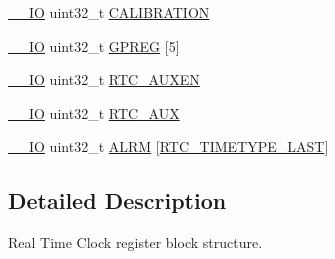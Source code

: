 \begin{DoxyCompactItemize}
\hyperlink{core__cm3_8h_aec43007d9998a0a0e01faede4133d6be}{\-\_\-\-\_\-\-I\-O} uint32\-\_\-t \hyperlink{structLPC__RTC__T_ade5b98ca9e6ea8af2fd91e8a4f20503b}{C\-A\-L\-I\-B\-R\-A\-T\-I\-O\-N}
\item 
\hyperlink{core__cm3_8h_aec43007d9998a0a0e01faede4133d6be}{\-\_\-\-\_\-\-I\-O} uint32\-\_\-t \hyperlink{structLPC__RTC__T_a6624a04c6db73e0f9e53a9bc3cf50c1a}{G\-P\-R\-E\-G} \mbox{[}5\mbox{]}
\item 
\hyperlink{core__cm3_8h_aec43007d9998a0a0e01faede4133d6be}{\-\_\-\-\_\-\-I\-O} uint32\-\_\-t \hyperlink{structLPC__RTC__T_af65651a26ceb3d710ccdba8f762a649f}{R\-T\-C\-\_\-\-A\-U\-X\-E\-N}
\item 
\hyperlink{core__cm3_8h_aec43007d9998a0a0e01faede4133d6be}{\-\_\-\-\_\-\-I\-O} uint32\-\_\-t \hyperlink{structLPC__RTC__T_ab476d508c9ea87e71724c30d36ece294}{R\-T\-C\-\_\-\-A\-U\-X}
\item 
\hyperlink{core__cm3_8h_aec43007d9998a0a0e01faede4133d6be}{\-\_\-\-\_\-\-I\-O} uint32\-\_\-t \hyperlink{structLPC__RTC__T_abeb0bd5d52ee9f40f515b9b007c7a832}{A\-L\-R\-M} \mbox{[}\hyperlink{group__RTC__17XX__40XX_gga8144898fe628404d396db06dc8aac0e0a0d4fafef57b6ef363f9a0875ff339cad}{R\-T\-C\-\_\-\-T\-I\-M\-E\-T\-Y\-P\-E\-\_\-\-L\-A\-S\-T}\mbox{]}
\end{DoxyCompactItemize}


\subsection{Detailed Description}
Real Time Clock register block structure. 

